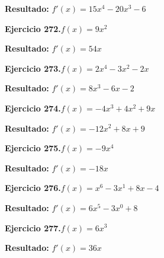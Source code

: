 \documentclass[10pt,a4paper]{article}
\begin{document}
\begin{solbox}
\textbf{Resultado:} \(\displaystyle f'(x) = 15x^{4} -20x^{3} -6\)
\end{solbox}

\begin{ejbox}
\textbf{Ejercicio 272.}\quad $f(x) = 9x^{2}$
\end{ejbox}

\begin{solbox}
\textbf{Resultado:} \(\displaystyle f'(x) = 54x\)
\end{solbox}

\begin{ejbox}
\textbf{Ejercicio 273.}\quad $f(x) = 2x^{4} -3x^2 -2x$
\end{ejbox}

\begin{solbox}
\textbf{Resultado:} \(\displaystyle f'(x) = 8x^{3} -6x -2\)
\end{solbox}

\newpage
\begin{ejbox}
\textbf{Ejercicio 274.}\quad $f(x) = -4x^3 +4x^2 +9x$
\end{ejbox}

\begin{solbox}
\textbf{Resultado:} \(\displaystyle f'(x) = -12x^2 +8x +9\)
\end{solbox}

\begin{ejbox}
\textbf{Ejercicio 275.}\quad $f(x) = -9x^{4}$
\end{ejbox}

\begin{solbox}
\textbf{Resultado:} \(\displaystyle f'(x) = -18x\)
\end{solbox}

\begin{ejbox}
\textbf{Ejercicio 276.}\quad $f(x) = x^{6} -3x^{1} +8x -4$
\end{ejbox}

\begin{solbox}
\textbf{Resultado:} \(\displaystyle f'(x) = 6x^{5} -3x^{0} +8\)
\end{solbox}

\newpage
\begin{ejbox}
\textbf{Ejercicio 277.}\quad $f(x) = 6x^{3}$
\end{ejbox}

\begin{solbox}
\textbf{Resultado:} \(\displaystyle f'(x) = 36x\)
\end{solbox}
\end{document}
